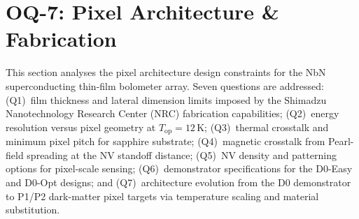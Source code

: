 %
%
%

\section{OQ-7: Pixel Architecture \& Fabrication}
\label{sec:pixel-fab}

This section analyses the pixel architecture design constraints for the NbN superconducting
thin-film bolometer array. Seven questions are addressed: (Q1)~film thickness and
lateral dimension limits imposed by the Shimadzu Nanotechnology Research Center
(NRC) fabrication capabilities; (Q2)~energy resolution versus pixel geometry at
$T_\mathrm{op} = 12$\,K; (Q3)~thermal crosstalk and minimum pixel pitch for
sapphire substrate; (Q4)~magnetic crosstalk from Pearl-field spreading at the NV
standoff distance; (Q5)~NV density and patterning options for pixel-scale sensing;
(Q6)~demonstrator specifications for the D0-Easy and D0-Opt designs; and
(Q7)~architecture evolution from the D0 demonstrator to P1/P2 dark-matter pixel
targets via temperature scaling and material substitution.

